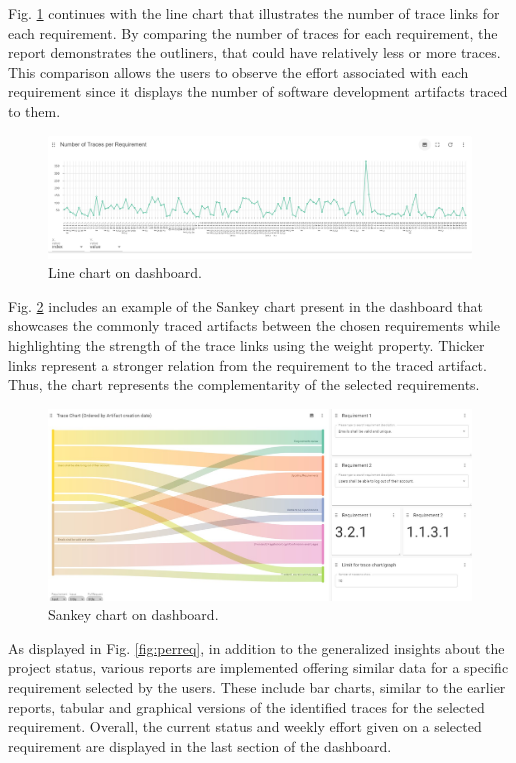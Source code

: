 Fig. \ref{fig:linechart} continues with the line chart that illustrates the number of trace links for each requirement. By comparing the number of traces for each requirement, the report demonstrates the outliners, that could have relatively less or more traces. This comparison allows the users to observe the effort associated with each requirement since it displays the number of software development artifacts traced to them.

\begin{figure}[htb]
    \centering
    \includegraphics[width=0.9\linewidth]{figs/linechart.png}
    \caption{Line chart on dashboard.}
    \label{fig:linechart}
\end{figure}

Fig. \ref{fig:sankey} includes an example of the Sankey chart present in the dashboard that showcases the commonly traced artifacts between the chosen requirements while highlighting the strength of the trace links using the weight property. Thicker links represent a stronger relation from the requirement to the traced artifact. Thus, the chart represents the complementarity of the selected requirements.

\begin{figure}[htb]
    \centering
    \includegraphics[width=0.9\linewidth]{figs/sankey.jpg}
    \caption{Sankey chart on dashboard.}
    \label{fig:sankey}
\end{figure}

As displayed in Fig. \ref{fig:perreq}, in addition to the generalized insights about the project status, various reports are implemented offering similar data for a specific requirement selected by the users. These include bar charts, similar to the earlier reports, tabular and graphical versions of the identified traces for the selected requirement. Overall, the current status and weekly effort given on a selected requirement are displayed in the last section of the dashboard.

